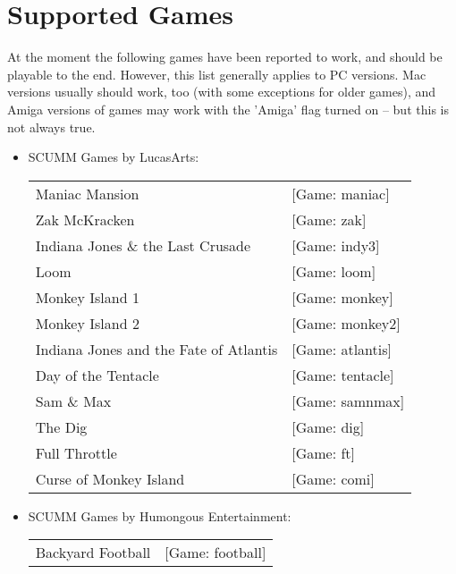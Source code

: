 


\section{Supported Games}

At the moment the following games have been reported to work, and should
be playable to the end. However, this list generally applies to PC versions.
Mac versions usually should work, too (with some exceptions for older games),
and Amiga versions of games may work with the 'Amiga' flag turned on -- but
this is not always true.

\begin{itemize}
\item SCUMM Games by LucasArts:\\
  \begin {tabular} [h] {ll}
    Maniac Mansion&                                [Game: maniac]\\
    Zak McKracken&                                 [Game: zak]\\
    Indiana Jones \& the Last Crusade&             [Game: indy3]\\
    Loom&                                          [Game: loom]\\
    Monkey Island 1&                               [Game: monkey]\\
    Monkey Island 2&                               [Game: monkey2]\\
    Indiana Jones and the Fate of Atlantis&        [Game: atlantis]\\
    Day of the Tentacle&                           [Game: tentacle]\\
    Sam \& Max&                                    [Game: samnmax]\\
    The Dig&                                       [Game: dig]\\
    Full Throttle&                                 [Game: ft]\\
    Curse of Monkey Island&                        [Game: comi]\\
  \end{tabular}
\item SCUMM Games by Humongous Entertainment:\\
  \begin{tabular}[h]{ll}
    Backyard Football&                                             [Game: football]\\

\end{tabular}
\end{itemize}
